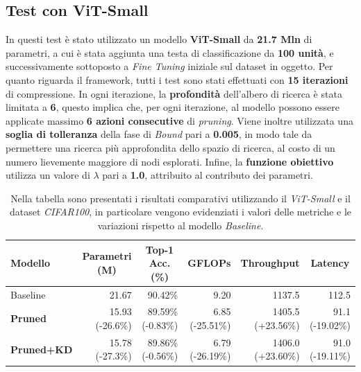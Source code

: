 \subsection{Test con ViT-Small}
In questi test è stato utilizzato un modello \textbf{ViT-Small} da \textbf{21.7
    Mln} di parametri, a cui è stata aggiunta una testa di classificazione da
\textbf{100 unità}, e successivamente sottoposto a \textit{Fine Tuning}
iniziale sul dataset in oggetto. Per quanto riguarda il framework, tutti i test
sono stati effettuati con \textbf{15 iterazioni} di compressione. In ogni
iterazione, la \textbf{profondità} dell'albero di ricerca è stata limitata a
\textbf{6}, questo implica che, per ogni iterazione, al modello possono essere
applicate massimo \textbf{6 azioni consecutive} di \textit{pruning}. Viene
inoltre utilizzata una \textbf{soglia di tolleranza} della fase di
\textit{Bound} pari a \textbf{0.005}, in modo tale da permettere una ricerca
più approfondita dello spazio di ricerca, al costo di un numero lievemente
maggiore di nodi esplorati. Infine, la \textbf{funzione obiettivo} utilizza un
valore di \textbf{$\lambda$} pari a \textbf{1.0}, attribuito al contributo dei
parametri. \newline 
\begin{table}[ht]
    \centering
    \label{tab:risultati-cifar100}
    \footnotesize 
    \setlength{\tabcolsep}{3pt} 
    \begin{tabular}{@{} l r r r r r @{}}
        \toprule
        \textbf{Modello} & \multicolumn{1}{c}{\textbf{Parametri (M)}} & \multicolumn{1}{c}{\textbf{Top-1 Acc. (\%)}} & \multicolumn{1}{c}{\textbf{GFLOPs}} & \multicolumn{1}{c}{\textbf{Throughput}} & \multicolumn{1}{c}{\textbf{Latency}} \\ \midrule
        Baseline           & 21.67 \hphantom{(-00.0\%)}        & 90.42\% \hphantom{(-0.00\%)}        & 9.20 \hphantom{(-00.00\%)}        & 1137.5 \hphantom{(+00.00\%)}        & 112.5 \hphantom{(-00.00\%)}       \\
        \midrule
        \textbf{Pruned}    & 15.93 (-26.6\%) & 89.59\% (-0.83\%) & 6.85 (-25.51\%) & 1405.5 (+23.56\%) & 91.1 (-19.02\%) \\
        \midrule
        \textbf{Pruned+KD} & 15.78 (-27.3\%) & 89.86\% (-0.56\%) & 6.79 (-26.19\%) & 1406.0 (+23.60\%) & 91.0 (-19.11\%) \\
        \bottomrule
    \end{tabular}
    \vspace{10pt}
    \caption{Nella tabella sono presentati i risultati comparativi utilizzando il \textit{ViT-Small} e il dataset \textit{CIFAR100}, in particolare vengono evidenziati i valori delle metriche e le variazioni rispetto al modello \textit{Baseline}.}
\end{table}

